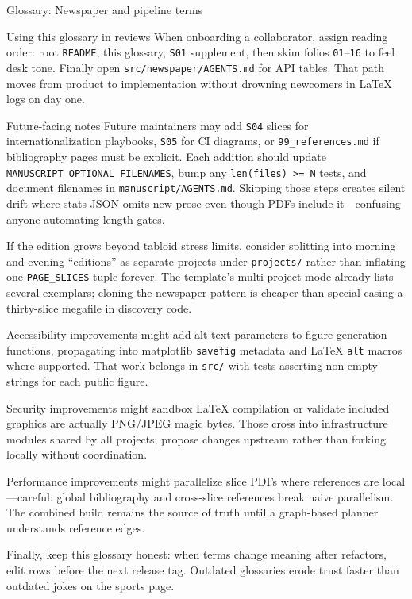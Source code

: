 \documentclass[
  ignorenonframetext,
]{beamer}
\begin{document}
\begin{frame}[fragile]{Glossary: Newspaper and pipeline terms}
\begin{block}{Using this glossary in reviews}
When onboarding a collaborator, assign reading order: root
\texttt{README}, this glossary, \texttt{S01} supplement, then skim
folios \texttt{01}--\texttt{16} to feel desk tone. Finally open
\texttt{src/newspaper/AGENTS.md} for API tables. That path moves from
product to implementation without drowning newcomers in LaTeX logs on
day one.
\end{block}

\begin{block}{Future-facing notes}
\protect{}\label{future-facing-notes}
Future maintainers may add \texttt{S04} slices for internationalization
playbooks, \texttt{S05} for CI diagrams, or \texttt{99\_references.md}
if bibliography pages must be explicit. Each addition should update
\texttt{MANUSCRIPT\_OPTIONAL\_FILENAMES}, bump any
\texttt{len(files)\ \textgreater{}=\ N} tests, and document filenames in
\texttt{manuscript/AGENTS.md}. Skipping those steps creates silent drift
where stats JSON omits new prose even though PDFs include it---confusing
anyone automating length gates.

If the edition grows beyond tabloid stress limits, consider splitting
into morning and evening ``editions'' as separate projects under
\texttt{projects/} rather than inflating one \texttt{PAGE\_SLICES} tuple
forever. The template's multi-project mode already lists several
exemplars; cloning the newspaper pattern is cheaper than special-casing
a thirty-slice megafile in discovery code.

Accessibility improvements might add alt text parameters to
figure-generation functions, propagating into matplotlib
\texttt{savefig} metadata and LaTeX \texttt{alt} macros where supported.
That work belongs in \texttt{src/} with tests asserting non-empty
strings for each public figure.

Security improvements might sandbox LaTeX compilation or validate
included graphics are actually PNG/JPEG magic bytes. Those cross into
infrastructure modules shared by all projects; propose changes upstream
rather than forking locally without coordination.

Performance improvements might parallelize slice PDFs where references
are local---careful: global bibliography and cross-slice references
break naive parallelism. The combined build remains the source of truth
until a graph-based planner understands reference edges.

Finally, keep this glossary honest: when terms change meaning after
refactors, edit rows before the next release tag. Outdated glossaries
erode trust faster than outdated jokes on the sports page.
\end{block}
\end{frame}
\end{document}
